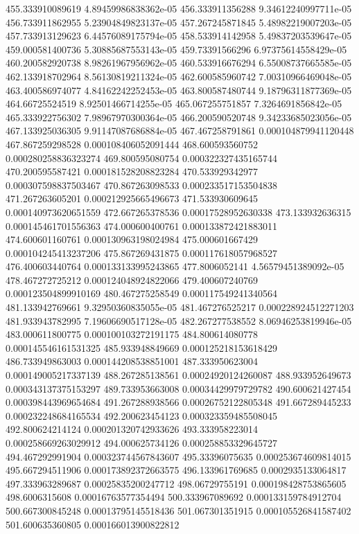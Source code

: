 {455.333910089619 4.89459986838362e-05
456.333911356288 9.34612240997711e-05
456.733911862955 5.23904849823137e-05
457.267245871845 5.48982219007203e-05
457.733913129623 6.44576089175794e-05
458.533914142958 5.49837203539647e-05
459.000581400736 5.30885687553143e-05
459.73391566296 6.97375614558429e-05
460.200582920738 8.98261967956962e-05
460.533916676294 6.55008737665585e-05
462.133918702964 8.56130819211324e-05
462.600585960742 7.00310966469048e-05
463.400586974077 4.84162242252453e-05
463.800587480744 9.18796311877369e-05
464.66725524519 8.92501466714255e-05
465.067255751857 7.3264691856842e-05
465.333922756302 7.98967970300364e-05
466.200590520748 9.34233685023056e-05
467.133925036305 9.91147087686884e-05
467.467258791861 0.000104879941120448
467.867259298528 0.000108406052091444
468.600593560752 0.000280258836323274
469.800595080754 0.000322327435165744
470.200595587421 0.000181528208823284
470.533929342977 0.000307598837503467
470.867263098533 0.000233517153504838
471.267263605201 0.000212925665496673
471.533930609645 0.000140973620651559
472.667265378536 0.00017528952630338
473.133932636315 0.000145461701556363
474.000600400761 0.000133872421883011
474.600601160761 0.000130963198024984
475.000601667429 0.000104245413237206
475.867269431875 0.000117618057968527
476.400603440764 0.000133133995243865
477.8006052141 4.56579451389092e-05
478.467272725212 0.000124048924822066
479.400607240769 0.000123504899910169
480.467275258549 0.000117549241340564
481.133942769661 9.32950360835055e-05
481.467276525217 0.000228924512271203
481.933943782995 7.19606690517128e-05
482.267277538552 8.06946253819946e-05
483.000611800775 0.000100103272191175
484.800614080778 0.000145546161531325
485.933948849669 0.000125218153618429
486.733949863003 0.000144208538851001
487.333950623004 0.000149005217337139
488.267285138561 0.00024920124260087
488.933952649673 0.000343137375153297
489.733953663008 0.00034429979729782
490.600621427454 0.000398443969654684
491.267288938566 0.00026752122805348
491.667289445233 0.000232248684165534
492.200623454123 0.000323359485508045
492.800624214124 0.000201320742933626
493.333958223014 0.000258669263029912
494.000625734126 0.000258853329645727
494.467292991904 0.000323744567843607
495.33396075635 0.000253674609814015
495.667294511906 0.000173892372663575
496.133961769685 0.0002935133064817
497.333963289687 0.00025835200247712
498.06729755191 0.000198428753865605
498.6006315608 0.00016763577354494
500.333967089692 0.000133159784912704
500.667300845248 0.00013795145518436
501.067301351915 0.000105526841587402
501.600635360805 0.000166013900822812
}
